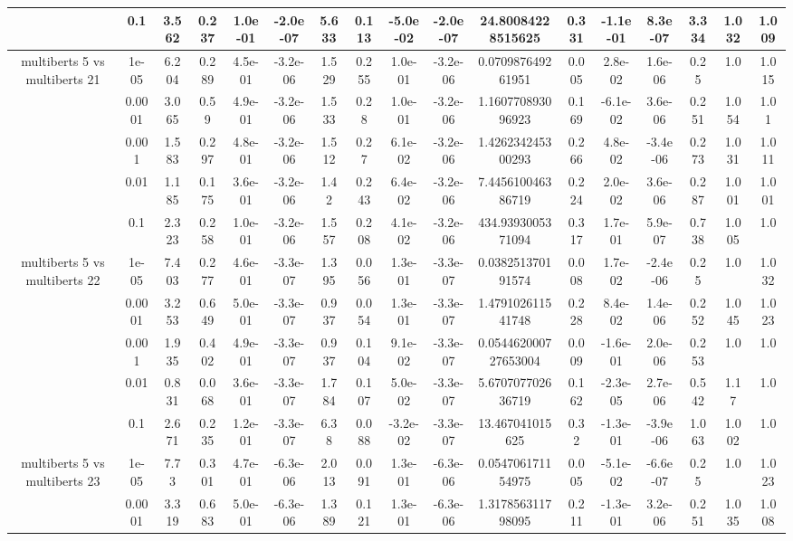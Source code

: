 \begin{tabular}{|c|c|c|c|c|c|c|c|c|c|c|c|c|c|c|c|c|}
 & 0.1 & 3.562 & 0.237 & 1.0e-01 & -2.0e-07 & 5.633 & 0.113 & -5.0e-02 & -2.0e-07 & 24.80084228515625 & 0.331 & -1.1e-01 & 8.3e-07 & 3.334 & 1.032 & 1.009 \\
\hline
\multirow{5}{*}{multiberts 5 vs multiberts 21} & 1e-05 & 6.204 & 0.289 & 4.5e-01 & -3.2e-06 & 1.529 & 0.255 & 1.0e-01 & -3.2e-06 & 0.070987649261951 & 0.005 & 2.8e-02 & 1.6e-06 & 0.25 & 1.0 & 1.015 \\
 & 0.0001 & 3.065 & 0.59 & 4.9e-01 & -3.2e-06 & 1.533 & 0.28 & 1.0e-01 & -3.2e-06 & 1.160770893096923 & 0.169 & -6.1e-02 & 3.6e-06 & 0.251 & 1.054 & 1.01 \\
 & 0.001 & 1.583 & 0.297 & 4.8e-01 & -3.2e-06 & 1.512 & 0.27 & 6.1e-02 & -3.2e-06 & 1.426234245300293 & 0.266 & 4.8e-02 & -3.4e-06 & 0.273 & 1.031 & 1.011 \\
 & 0.01 & 1.185 & 0.175 & 3.6e-01 & -3.2e-06 & 1.42 & 0.243 & 6.4e-02 & -3.2e-06 & 7.445610046386719 & 0.224 & 2.0e-02 & 3.6e-06 & 0.287 & 1.001 & 1.001 \\
 & 0.1 & 2.323 & 0.258 & 1.0e-01 & -3.2e-06 & 1.557 & 0.208 & 4.1e-02 & -3.2e-06 & 434.9393005371094 & 0.317 & 1.7e-01 & 5.9e-07 & 0.738 & 1.005 & 1.0 \\
\hline
\multirow{5}{*}{multiberts 5 vs multiberts 22} & 1e-05 & 7.403 & 0.277 & 4.6e-01 & -3.3e-07 & 1.395 & 0.056 & 1.3e-01 & -3.3e-07 & 0.038251370191574 & 0.008 & 1.7e-02 & -2.4e-06 & 0.25 & 1.0 & 1.032 \\
 & 0.0001 & 3.253 & 0.649 & 5.0e-01 & -3.3e-07 & 0.937 & 0.054 & 1.3e-01 & -3.3e-07 & 1.479102611541748 & 0.228 & 8.4e-02 & 1.4e-06 & 0.252 & 1.045 & 1.023 \\
 & 0.001 & 1.935 & 0.402 & 4.9e-01 & -3.3e-07 & 0.937 & 0.104 & 9.1e-02 & -3.3e-07 & 0.054462000727653004 & 0.009 & -1.6e-01 & 2.0e-06 & 0.253 & 1.0 & 1.0 \\
 & 0.01 & 0.831 & 0.068 & 3.6e-01 & -3.3e-07 & 1.784 & 0.107 & 5.0e-02 & -3.3e-07 & 5.670707702636719 & 0.162 & -2.3e-05 & 2.7e-06 & 0.542 & 1.17 & 1.0 \\
 & 0.1 & 2.671 & 0.235 & 1.2e-01 & -3.3e-07 & 6.38 & 0.088 & -3.2e-02 & -3.3e-07 & 13.467041015625 & 0.32 & -1.3e-01 & -3.9e-06 & 1.063 & 1.002 & 1.0 \\
\hline
\multirow{5}{*}{multiberts 5 vs multiberts 23} & 1e-05 & 7.73 & 0.301 & 4.7e-01 & -6.3e-06 & 2.013 & 0.091 & 1.3e-01 & -6.3e-06 & 0.054706171154975 & 0.005 & -5.1e-02 & -6.6e-07 & 0.25 & 1.0 & 1.023 \\
 & 0.0001 & 3.319 & 0.683 & 5.0e-01 & -6.3e-06 & 1.389 & 0.121 & 1.3e-01 & -6.3e-06 & 1.317856311798095 & 0.211 & -1.3e-01 & 3.2e-06 & 0.251 & 1.035 & 1.008 \\

\end{tabular}
